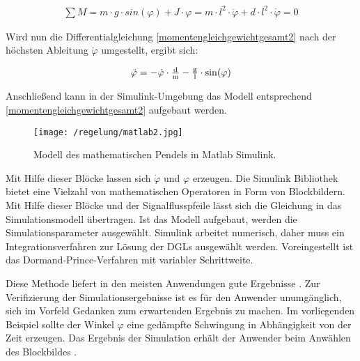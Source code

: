 \begin{align}
	\sum M = m \cdot g \cdot \si{sin}(\varphi) + J \cdot \varphi = m \cdot l^{2} \cdot \ddot\varphi + d \cdot l^{2} \cdot \dot\varphi = 0
	\label{momentengleichgewichtgesamt2} 
\end{align}

Wird nun die Differentialgleichung \ref{momentengleichgewichtgesamt2} nach der höchsten Ableitung $\ddot\varphi$ umgestellt, ergibt sich:

\begin{align}
	\ddot\varphi = -\dot\varphi \cdot \tfrac{\i{d}}{\i{m}} - \tfrac{\i{g}}{\i{l}} \cdot \si{sin}(\varphi)
	\label{diffgleichung} 
\end{align}


Anschließend kann in der Simulink-Umgebung das Modell entsprechend \ref{momentengleichgewichtgesamt2} aufgebaut werden.

\begin{figure}[h]
	\centering
	\texttt{[image: /regelung/matlab2.jpg]}
	\label{fig:matlab2}
	\caption{Modell des mathematischen Pendels in Matlab Simulink.}
\end{figure}
\pagebreak
Mit Hilfe dieser Blöcke lassen sich  $\dot{\varphi}$ und $\varphi$ erzeugen.
Die Simulink Bibliothek bietet eine Vielzahl von mathematischen Operatoren in Form von Blockbildern.
Mit Hilfe dieser Blöcke und der Signalflusspfeile lässt sich die Gleichung in das Simulationsmodell übertragen.
Ist das Modell aufgebaut, werden die Simulationsparameter ausgewählt. 
Simulink arbeitet numerisch, daher muss ein Integrationsverfahren zur Lösung der DGLs ausgewählt werden. Voreingestellt ist das Dormand-Prince-Verfahren mit variabler Schrittweite.

Diese Methode liefert in den meisten Anwendungen gute Ergebnisse \autocite{scherf2010}.
Zur Verifizierung der Simulationsergebnisse ist es für den Anwender unumgänglich, sich im Vorfeld Gedanken zum erwartenden Ergebnis zu machen.
Im vorliegenden Beispiel sollte der Winkel $\varphi$ eine gedämpfte Schwingung in Abhängigkeit von der Zeit erzeugen.
Das Ergebnis der Simulation erhält der Anwender beim Anwählen des Blockbildes \grqq.

